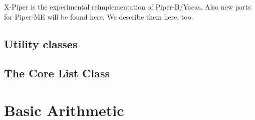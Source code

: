 X-Piper is the experimental reimplementation of Piper-B/Yacas. Also
new parts for Piper-ME will be found here. We describe them here, too.


\subsection{Utility classes}




\subsection{The Core List Class}



\section{Basic Arithmetic}






